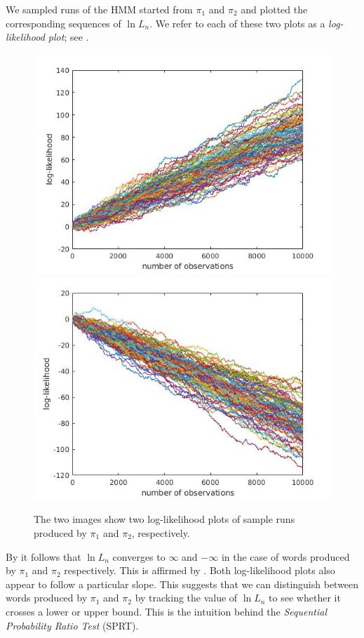 \documentclass[a4paper,UKenglish,cleveref, autoref,mathscr]{lipics-v2019}
\newcommand{\1}{\mathbbm{1}}
\begin{document}
\begin{example}
We sampled runs of the HMM started from $\pi_1$ and $\pi_2$ and plotted the corresponding sequences of $\ln L_n$. We refer to each of these two plots as a \emph{log-likelihood plot}; see .
\begin{center}
	\begin{figure}[h]
		\includegraphics[width=\textwidth/2]{loglikepositiveruns100000_100.jpg}	
		\includegraphics[width=\textwidth/2]{loglikenegativeruns100000_100.jpg}
		\caption{The two images show two log-likelihood plots of sample runs produced by $\pi_1$ and $\pi_2$, respectively.}\label{loglikes}
	\end{figure}
\end{center}
By  it follows that $\ln L_n$ converges to $\infty$ and $-\infty$ in the case of words produced by $\pi_1$ and $\pi_2$ respectively. This is affirmed by . Both log-likelihood plots also appear to follow a particular slope. This suggests that we can distinguish between words produced by $\pi_1$ and $\pi_2$ by tracking the value of $\ln L_n$ to see whether it crosses a lower or upper bound. This is the intuition behind the \emph{Sequential Probability Ratio Test} (SPRT).

\end{example}
\end{document}
